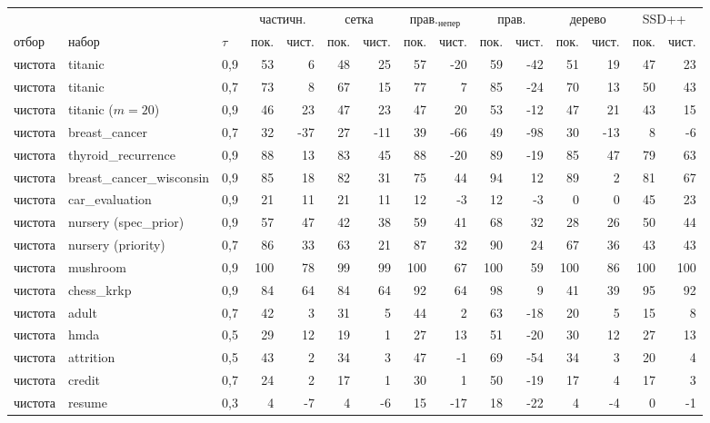 \begin{tabular}{lllrrrrrrrrrrrr}
\toprule
& & & \multicolumn{2}{c}{частичн.} & \multicolumn{2}{c}{сетка} & \multicolumn{2}{c}{прав.$_{\mathrm{непер}}$} & \multicolumn{2}{c}{прав.} & \multicolumn{2}{c}{дерево} & \multicolumn{2}{c}{SSD++}\\
отбор & набор & $\tau$  & пок. & чист. & пок. & чист. & пок. & чист. & пок. & чист. & пок. & чист. & пок. & чист.\\
\midrule
чистота & titanic & 0{,}9 & 53 & 6 & 48 & 25 & 57 & -20 & 59 & -42 & 51 & 19 & 47 & 23\\
чистота & titanic & 0{,}7 & 73 & 8 & 67 & 15 & 77 & 7 & 85 & -24 & 70 & 13 & 50 & 43\\
чистота & titanic ($m{=}20$) & 0{,}9 & 46 & 23 & 47 & 23 & 47 & 20 & 53 & -12 & 47 & 21 & 43 & 15\\
чистота & breast\_cancer & 0{,}7 & 32 & -37 & 27 & -11 & 39 & -66 & 49 & -98 & 30 & -13 & 8 & -6\\
чистота & thyroid\_recurrence & 0{,}9 & 88 & 13 & 83 & 45 & 88 & -20 & 89 & -19 & 85 & 47 & 79 & 63\\
чистота & breast\_cancer\_wisconsin & 0{,}9 & 85 & 18 & 82 & 31 & 75 & 44 & 94 & 12 & 89 & 2 & 81 & 67\\
чистота & car\_evaluation & 0{,}9 & 21 & 11 & 21 & 11 & 12 & -3 & 12 & -3 & 0 & 0 & 45 & 23\\
чистота & nursery (spec\_prior) & 0{,}9 & 57 & 47 & 42 & 38 & 59 & 41 & 68 & 32 & 28 & 26 & 50 & 44\\
чистота & nursery (priority) & 0{,}7 & 86 & 33 & 63 & 21 & 87 & 32 & 90 & 24 & 67 & 36 & 43 & 43\\
чистота & mushroom & 0{,}9 & 100 & 78 & 99 & 99 & 100 & 67 & 100 & 59 & 100 & 86 & 100 & 100\\
чистота & chess\_krkp & 0{,}9 & 84 & 64 & 84 & 64 & 92 & 64 & 98 & 9 & 41 & 39 & 95 & 92\\
чистота & adult & 0{,}7 & 42 & 3 & 31 & 5 & 44 & 2 & 63 & -18 & 20 & 5 & 15 & 8\\
чистота & hmda & 0{,}5 & 29 & 12 & 19 & 1 & 27 & 13 & 51 & -20 & 30 & 12 & 27 & 13\\
чистота & attrition & 0{,}5 & 43 & 2 & 34 & 3 & 47 & -1 & 69 & -54 & 34 & 3 & 20 & 4\\
чистота & credit & 0{,}7 & 24 & 2 & 17 & 1 & 30 & 1 & 50 & -19 & 17 & 4 & 17 & 3\\
чистота & resume & 0{,}3 & 4 & -7 & 4 & -6 & 15 & -17 & 18 & -22 & 4 & -4 & 0 & -1\\

\end{tabular}
